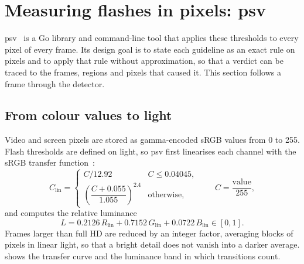 \documentclass[11pt,a4paper]{article}
\newcommand{\psv}{\textsf{psv}}
\begin{document}
\section{Measuring flashes in pixels: \psv{}}
\label{sec:psv}

\psv{}~\cite{psv} is a Go library and command-line tool that applies these thresholds to every pixel of every frame. Its design goal is to state each guideline as an exact rule on pixels and to apply that rule without approximation, so that a verdict can be traced to the frames, regions and pixels that caused it. This section follows a frame through the detector.

\subsection{From colour values to light}
\label{sec:luminance}

Video and screen pixels are stored as gamma-encoded sRGB values from 0 to 255. Flash thresholds are defined on light, so \psv{} first linearises each channel with the sRGB transfer function~\cite{srgb}:
\begin{equation}
  C_{\text{lin}} =
  \begin{cases}
    C/12.92 & C \le 0.04045,\\[2pt]
    \left(\dfrac{C+0.055}{1.055}\right)^{2.4} & \text{otherwise,}
  \end{cases}
  \qquad C = \frac{\text{value}}{255},
\end{equation}
and computes the relative luminance
\begin{equation}
  L = 0.2126\,R_{\text{lin}} + 0.7152\,G_{\text{lin}} + 0.0722\,B_{\text{lin}} \in [0,1].
  \label{eq:luminance}
\end{equation}
Frames larger than full HD are reduced by an integer factor, averaging blocks of pixels in linear light, so that a bright detail does not vanish into a darker average.  shows the transfer curve and the luminance band in which transitions count.
\end{document}
